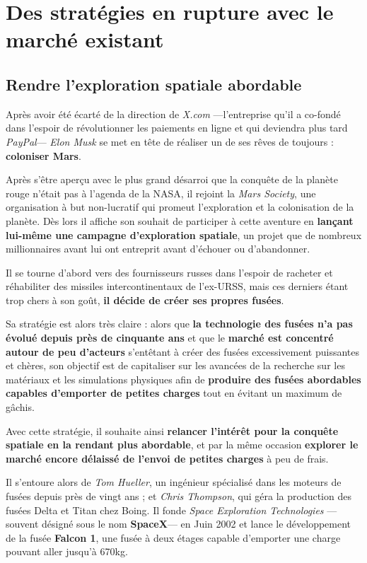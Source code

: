 \chapter{Des stratégies en rupture avec le marché existant}

\section{Rendre l'exploration spatiale abordable}

Après avoir été écarté de la direction de \textit{X.com} ---l'entreprise qu'il a co-fondé dans l'espoir de révolutionner les paiements en ligne et qui deviendra plus tard \textit{PayPal}--- \textit{Elon Musk} se met en tête de réaliser un de ses rêves de toujours : \textbf{coloniser Mars}.

Après s'être aperçu avec le plus grand désarroi que la conquête de la planète rouge n'était pas à l'agenda de la NASA, il rejoint la \textit{Mars Society}, une organisation à but non-lucratif qui promeut l'exploration et la colonisation de la planète. Dès lors il affiche son souhait de participer à cette aventure en \textbf{lançant lui-même une campagne d'exploration spatiale}, un projet que de nombreux millionnaires avant lui ont entreprit avant d'échouer ou d'abandonner.

Il se tourne d'abord vers des fournisseurs russes dans l'espoir de racheter et réhabiliter des missiles intercontinentaux de l'ex-URSS, mais ces derniers étant trop chers à son goût, \textbf{il décide de créer ses propres fusées}.

\vspace{5mm}

Sa stratégie est alors très claire : alors que \textbf{la technologie des fusées n'a pas évolué depuis près de cinquante ans} et que le \textbf{marché est concentré autour de peu d'acteurs} s'entêtant à créer des fusées excessivement puissantes et chères, son objectif est de capitaliser sur les avancées de la recherche sur les matériaux et les simulations physiques afin de \textbf{produire des fusées abordables capables d'emporter de petites charges} tout en évitant un maximum de gâchis.

Avec cette stratégie, il souhaite ainsi \textbf{relancer l'intérêt pour la conquête spatiale en la rendant plus abordable}, et par la même occasion \textbf{explorer le marché encore délaissé de l'envoi de petites charges} à peu de frais.

Il s'entoure alors de \textit{Tom Hueller}, un ingénieur spécialisé dans les moteurs de fusées depuis près de vingt ans ; et \textit{Chris Thompson}, qui géra la production des fusées Delta et Titan chez Boing. Il fonde \textit{Space Exploration Technologies} ---souvent désigné sous le nom \textbf{SpaceX}--- en Juin 2002 et lance le développement de la fusée \textbf{Falcon 1}, une fusée à deux étages capable d'emporter une charge pouvant aller jusqu'à 670kg.

